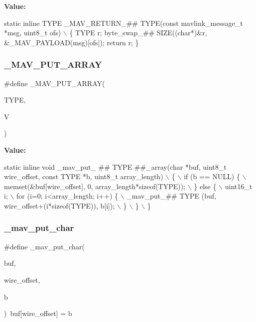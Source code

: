 {\bfseries Value\+:}
\begin{DoxyCode}
\textcolor{keyword}{static} \textcolor{keyword}{inline} TYPE \_MAV\_RETURN\_## TYPE(\textcolor{keyword}{const} mavlink\_message\_t *msg, uint8\_t ofs) \(\backslash\)
\{ TYPE r; byte\_swap\_## SIZE((\textcolor{keywordtype}{char}*)&r, &_MAV_PAYLOAD(msg)[ofs]); \textcolor{keywordflow}{return} r; \}
\end{DoxyCode}
\mbox{\label{protocol_8h_a7b9a101961be6123bd351fb54832b82c}} 
\subsubsection{\+\_\+\+M\+A\+V\+\_\+\+P\+U\+T\+\_\+\+A\+R\+R\+AY}
{\footnotesize\ttfamily \#define \+\_\+\+M\+A\+V\+\_\+\+P\+U\+T\+\_\+\+A\+R\+R\+AY(\begin{DoxyParamCaption}\item[{}]{T\+Y\+PE,  }\item[{}]{V }\end{DoxyParamCaption})}

{\bfseries Value\+:}
\begin{DoxyCode}
\textcolor{keyword}{static} \textcolor{keyword}{inline} \textcolor{keywordtype}{void} \_mav\_put\_ ## TYPE ##\_array(\textcolor{keywordtype}{char} *buf, uint8\_t wire\_offset, \textcolor{keyword}{const} TYPE *b, uint8\_t 
      array\_length) \(\backslash\)
\{ \(\backslash\)
    if (b == NULL) \{ \(\backslash\)
        memset(&buf[wire\_offset], 0, array\_length*\textcolor{keyword}{sizeof}(TYPE)); \(\backslash\)
    \} \textcolor{keywordflow}{else} \{ \(\backslash\)
        uint16\_t i; \(\backslash\)
        for (i=0; i<array\_length; i++) \{ \(\backslash\)
            \_mav\_put\_## TYPE (buf, wire\_offset+(i*\textcolor{keyword}{sizeof}(TYPE)), b[i]); \(\backslash\)
        \} \(\backslash\)
    \} \(\backslash\)
\}
\end{DoxyCode}
\mbox{\label{protocol_8h_a9ce78106f21ac1c13c1242f5ad11612b}} 
\subsubsection{\+\_\+mav\+\_\+put\+\_\+char}
{\footnotesize\ttfamily \#define \+\_\+mav\+\_\+put\+\_\+char(\begin{DoxyParamCaption}\item[{}]{buf,  }\item[{}]{wire\+\_\+offset,  }\item[{}]{b }\end{DoxyParamCaption})~buf[wire\+\_\+offset] = b}

